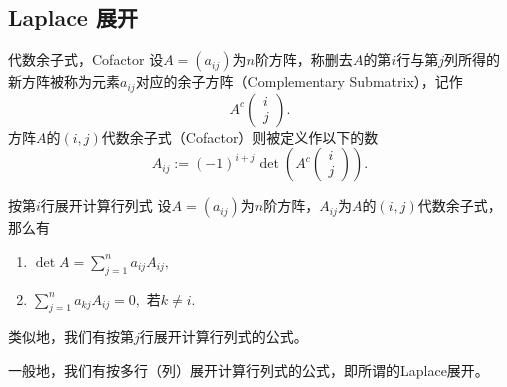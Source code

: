 
\subsection{Laplace 展开}


\begin{frame}


\begin{block}{代数余子式，Cofactor}
设$A=(a_{ij})$为$n$阶方阵，称删去$A$的第$i$行与第$j$列所得的新方阵被称为元素$a_{ij}$对应的余子方阵（Complementary Submatrix），记作
$$A^c\begin{pmatrix} i \\ j \end{pmatrix}.$$
方阵$A$的$(i,j)$代数余子式（Cofactor）则被定义作以下的数
$$A_{ij} := (-1)^{i+j} \det\left( A^c\begin{pmatrix} i \\ j \end{pmatrix} \right).$$
\end{block}

\end{frame}


\begin{frame}

\begin{block}{按第$i$行展开计算行列式}
设$A=(a_{ij})$为$n$阶方阵，$A_{ij}$为$A$的$(i,j)$代数余子式，那么有\pause
\begin{enumerate}
\item \(\displaystyle \det A = \sum\limits_{j = 1}^n a_{ij}A_{ij},\)
\item \(\displaystyle \sum\limits_{j = 1}^n a_{kj}A_{ij} = 0,\) 若$k\neq i$.
\end{enumerate}

\pause

类似地，我们有按第$j$行展开计算行列式的公式。
\end{block}

\vspace{1em}
\pause

一般地，我们有按多行（列）展开计算行列式的公式，即所谓的Laplace展开。

\end{frame}

